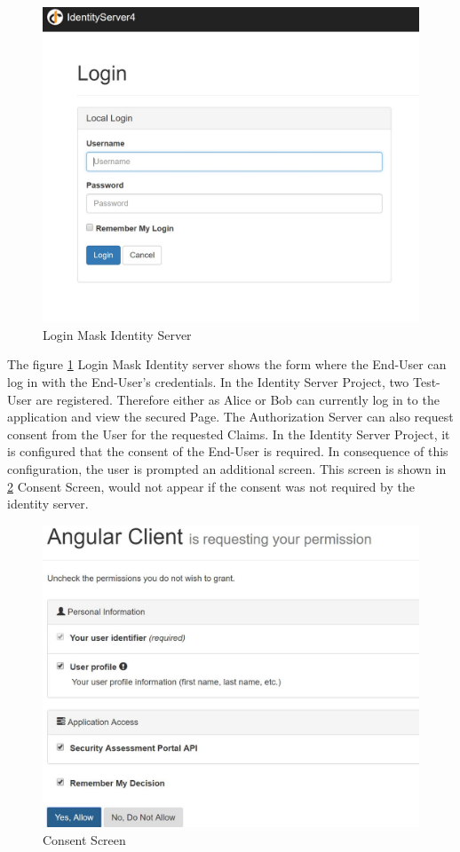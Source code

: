 \begin{figure}[h]
	\centering
	\includegraphics[width=0.8\linewidth]{images/login_identity_server}
	\caption{Login Mask Identity Server}
	\label{fig:loginidentityserver}
\end{figure}


The figure \ref{fig:loginidentityserver} Login Mask Identity server shows the form where the End-User can log in with the End-User’s credentials. In the Identity Server Project, two Test-User are registered. Therefore either as Alice or Bob can currently log in to the application and view the secured Page. 
The Authorization Server can also request consent from the User for the requested Claims. In the Identity Server Project, it is configured that the consent of the End-User is required. In consequence of this configuration, the user is prompted an additional screen. This screen is shown in \ref{fig:consentscreen} Consent Screen, would not appear if the consent was not required by the identity server. 

\begin{figure}[h]
	\centering
	\includegraphics[width=0.8\linewidth]{images/consent_screen}
	\caption{Consent Screen}
	\label{fig:consentscreen}
\end{figure}


